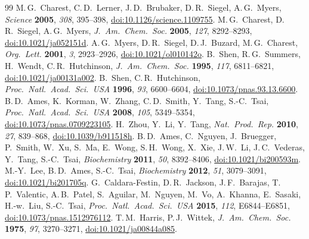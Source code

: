 \documentclass[11pt,a4paper]{article}
\begin{document}
\raggedright
\begin{thebibliography}{99}
 M.\,G.\ Charest, C.\,D.\ Lerner, J.\,D.\ Brubaker, D.\,R.\ Siegel, A.\,G.\ Myers, \textit{Science} \textbf{2005}, \textit{308}, 395--398, \href{https://doi.org/10.1126/science.1109755}{doi:10.1126/science.1109755}.
 M.\,G.\ Charest, D.\,R.\ Siegel, A.\,G.\ Myers, \textit{J.\ Am.\ Chem.\ Soc.} \textbf{2005}, \textit{127}, 8292--8293, \href{https://doi.org/10.1021/ja052151d}{doi:10.1021/ja052151d}.
 A.\,G.\ Myers, D.\,R.\ Siegel, D.\,J.\ Buzard, M.\,G.\ Charest, \textit{Org.\ Lett.} \textbf{2001}, \textit{3}, 2923--2926, \href{https://doi.org/10.1021/ol010142o}{doi:10.1021/ol010142o}.
 B.\ Shen, R.\,G.\ Summers, H.\ Wendt, C.\,R.\ Hutchinson, \textit{J.\ Am.\ Chem.\ Soc.} \textbf{1995}, \textit{117}, 6811--6821, \href{https://doi.org/10.1021/ja00131a002}{doi:10.1021/ja00131a002}.
 B.\ Shen, C.\,R.\ Hutchinson, \textit{Proc.\ Natl.\ Acad.\ Sci.\ USA} \textbf{1996}, \textit{93}, 6600--6604, \href{https://doi.org/10.1073/pnas.93.13.6600}{doi:10.1073/pnas.93.13.6600}.
 B.\,D.\ Ames, K.\ Korman, W.\ Zhang, C.\,D.\ Smith, Y.\ Tang, S.-C.\ Tsai, \textit{Proc.\ Natl.\ Acad.\ Sci.\ USA} \textbf{2008}, \textit{105}, 5349--5354, \href{https://doi.org/10.1073/pnas.0709223105}{doi:10.1073/pnas.0709223105}.
 H.\ Zhou, Y.\ Li, Y.\ Tang, \textit{Nat.\ Prod.\ Rep.} \textbf{2010}, \textit{27}, 839--868, \href{https://doi.org/10.1039/b911518h}{doi:10.1039/b911518h}.
 B.\,D.\ Ames, C.\ Nguyen, J.\ Bruegger, P.\ Smith, W.\ Xu, S.\ Ma, E.\ Wong, S.\,H.\ Wong, X.\ Xie, J.\,W.\ Li, J.\,C.\ Vederas, Y.\ Tang, S.-C.\ Tsai, \textit{Biochemistry} \textbf{2011}, \textit{50}, 8392--8406, \href{https://doi.org/10.1021/bi200593m}{doi:10.1021/bi200593m}.
 M.-Y.\ Lee, B.\,D.\ Ames, S.-C.\ Tsai, \textit{Biochemistry} \textbf{2012}, \textit{51}, 3079--3091, \href{https://doi.org/10.1021/bi201705q}{doi:10.1021/bi201705q}.
 G.\ Caldara-Festin, D.\,R.\ Jackson, J.\,F.\ Barajas, T.\,P.\ Valentic, A.\,B.\ Patel, S.\ Aguilar, M.\ Nguyen, M.\ Vo, A.\ Khanna, E.\ Sasaki, H.-w.\ Liu, S.-C.\ Tsai, \textit{Proc.\ Natl.\ Acad.\ Sci.\ USA} \textbf{2015}, \textit{112}, E6844--E6851, \href{https://doi.org/10.1073/pnas.1512976112}{doi:10.1073/pnas.1512976112}.
 T.\,M.\ Harris, P.\,J.\ Wittek, \textit{J.\ Am.\ Chem.\ Soc.} \textbf{1975}, \textit{97}, 3270--3271, \href{https://doi.org/10.1021/ja00844a085}{doi:10.1021/ja00844a085}.

\end{thebibliography}
\end{document}
